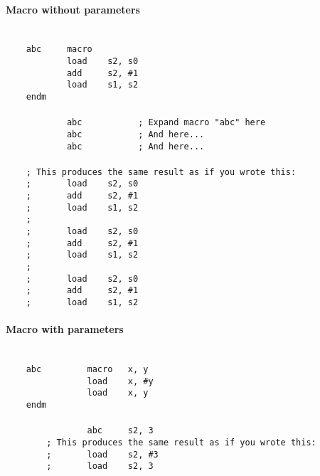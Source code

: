         \paragraph{Macro without parameters}
            ~\\
            \verb'    abc     macro'\\
            \verb'            load    s2, s0'\\
            \verb'            add     s2, #1'\\
            \verb'            load    s1, s2'\\
            \verb'    endm'\\
            \verb''\\
            \verb'            abc           ; Expand macro "abc" here'\\
            \verb'            abc           ; And here...'\\
            \verb'            abc           ; And here...'\\
            \verb''\\
            \verb'    ; This produces the same result as if you wrote this:'\\
            \verb'    ;       load    s2, s0'\\
            \verb'    ;       add     s2, #1'\\
            \verb'    ;       load    s1, s2'\\
            \verb'    ;'\\
            \verb'    ;       load    s2, s0'\\
            \verb'    ;       add     s2, #1'\\
            \verb'    ;       load    s1, s2'\\
            \verb'    ;'\\
            \verb'    ;       load    s2, s0'\\
            \verb'    ;       add     s2, #1'\\
            \verb'    ;       load    s1, s2'\\

        \paragraph{Macro with parameters}
            ~\\
            \verb'    abc         macro   x, y'\\
            \verb'                load    x, #y'\\
            \verb'                load    x, y'\\
            \verb'    endm'\\
            \verb''\\
            \verb'                abc     s2, 3'\\
            \verb'        ; This produces the same result as if you wrote this:'\\
            \verb'        ;       load    s2, #3'\\
            \verb'        ;       load    s2, 3'

